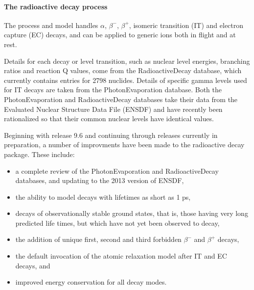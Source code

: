 \paragraph{The radioactive decay process}
The  process and model handles $\alpha$, $\beta^-$,
$\beta^+$, isomeric transition (IT) and electron capture (EC) decays, and can be
applied to generic ions both in flight and at rest.   

Details for each decay or level transition, such as nuclear level energies, 
branching ratios and reaction Q values, come from the \Gfour{} RadioactiveDecay 
database, which currently contains entries for 2798 nuclides.  Details of 
specific gamma levels used for IT decays are taken from the \Gfour{} 
PhotonEvaporation database.  Both the PhotonEvaporation and RadioactiveDecay 
databases take their data from the Evaluated Nuclear Structure Data File (ENSDF)
\cite{hadbib:ENSDF} and have recently been rationalized so that their common 
nuclear levels have identical values.

Beginning with \Gfour{} release 9.6 and continuing through releases currently in
preparation, a number of improvments have been made to the radioactive decay 
package.  These include:

\begin{itemize}
\item a complete review of the PhotonEvaporation and RadioactiveDecay databases,
      and updating to the 2013 version of ENSDF,
\item the ability to model decays with lifetimes as short as 1 ps,
\item decays of observationally stable ground states, that is, those having
      very long predicted life times, but which have not yet been observed to 
      decay,  
\item the addition of unique first, second and third forbidden $\beta^-$ and
      $\beta^+$ decays,
\item the default invocation of the atomic relaxation model after IT and EC 
      decays, and 
\item improved energy conservation for all decay modes.
\end{itemize}

